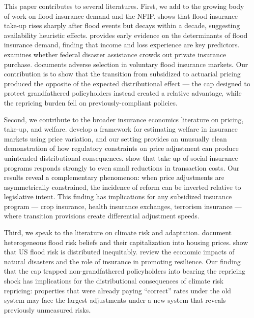 \documentclass[12pt]{article}
\begin{document}
This paper contributes to several literatures. First, we add to the growing body of work on flood insurance demand and the NFIP. \citet{gallagher2014} shows that flood insurance take-up rises sharply after flood events but decays within a decade, suggesting availability heuristic effects. \citet{browne2000} provides early evidence on the determinants of flood insurance demand, finding that income and loss experience are key predictors. \citet{kousky2017} examines whether federal disaster assistance crowds out private insurance purchase. \citet{bradt2021} documents adverse selection in voluntary flood insurance markets. Our contribution is to show that the transition from subsidized to actuarial pricing produced the opposite of the expected distributional effect --- the cap designed to protect grandfathered policyholders instead created a relative advantage, while the repricing burden fell on previously-compliant policies.

Second, we contribute to the broader insurance economics literature on pricing, take-up, and welfare. \citet{einav2010} develop a framework for estimating welfare in insurance markets using price variation, and our setting provides an unusually clean demonstration of how regulatory constraints on price adjustment can produce unintended distributional consequences. \citet{finkelstein2019} show that take-up of social insurance programs responds strongly to even small reductions in transaction costs. Our results reveal a complementary phenomenon: when price adjustments are asymmetrically constrained, the incidence of reform can be inverted relative to legislative intent. This finding has implications for any subsidized insurance program --- crop insurance, health insurance exchanges, terrorism insurance --- where transition provisions create differential adjustment speeds.

Third, we speak to the literature on climate risk and adaptation. \citet{bakkensen2022} document heterogeneous flood risk beliefs and their capitalization into housing prices. \citet{wing2022} show that US flood risk is distributed inequitably. \citet{botzen2019} review the economic impacts of natural disasters and the role of insurance in promoting resilience. Our finding that the cap trapped non-grandfathered policyholders into bearing the repricing shock has implications for the distributional consequences of climate risk repricing: properties that were already paying ``correct'' rates under the old system may face the largest adjustments under a new system that reveals previously unmeasured risks.
\end{document}
